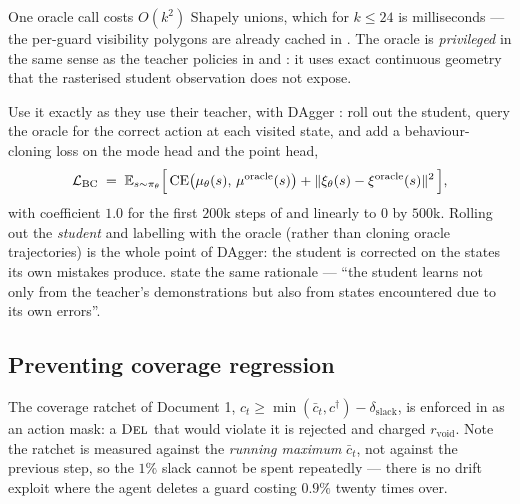 \documentclass[11pt,a4paper]{article}
\begin{document}
\noindent
One oracle call costs $O(k^2)$ Shapely unions, which for $k \le 24$ is milliseconds --- the
per-guard visibility polygons are already cached in . The oracle
is \emph{privileged} in the same sense as the teacher policies in
\citet{xu2025striker} and \citet{pinto2018asymmetric}: it uses exact continuous geometry that
the rasterised student observation does not expose.

Use it exactly as they use their teacher, with DAgger \cite{ross2011dagger}: roll out the
student, query the oracle for the correct action at each visited state, and add a
behaviour-cloning loss on the mode head and the point head,
\[
  \mathcal{L}_{\mathrm{BC}}
  \;=\; \mathbb{E}_{s \sim \pi_\theta}\Bigl[\,
    \mathrm{CE}\bigl(\mu_\theta(s),\, \mu^{\mathrm{oracle}}(s)\bigr)
    + \lVert \xi_\theta(s) - \xi^{\mathrm{oracle}}(s)\rVert^2 \,\Bigr],
\]
with coefficient $1.0$ for the first $200$k steps of \stageII{} and linearly to $0$ by
$500$k. Rolling out the \emph{student} and labelling with the oracle (rather than cloning
oracle trajectories) is the whole point of DAgger: the student is corrected on the states
its own mistakes produce. \citet{xu2025striker} state the same rationale --- ``the student
learns not only from the teacher's demonstrations but also from states encountered due to
its own errors''.


\subsection{Preventing coverage regression}

The coverage ratchet of Document 1, $c_t \ge \min(\bar c_t, c^\dagger) - \delta_{\mathrm{slack}}$,
is enforced in \stageII{} as an action mask: a $\textsc{Del}$ that would violate it is rejected and
charged $r_{\mathrm{void}}$. Note the ratchet is measured against the \emph{running maximum}
$\bar c_t$, not against the previous step, so the $1\%$ slack cannot be spent repeatedly ---
there is no drift exploit where the agent deletes a guard costing $0.9\%$ twenty times over.
\end{document}
